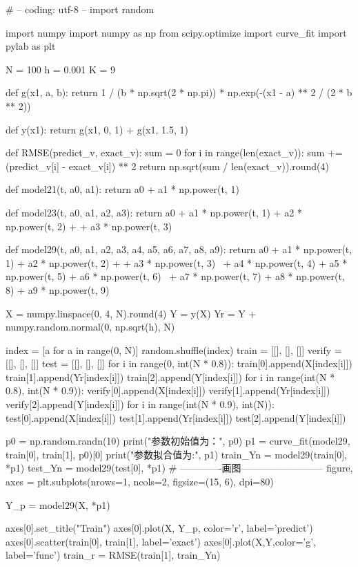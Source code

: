 \begin{python}
    # -- coding: utf-8 --
import random

import numpy
import numpy as np
from scipy.optimize import curve_fit
import pylab as plt

N = 100
h = 0.001
K = 9


def g(x1, a, b):
    return 1 / (b * np.sqrt(2 * np.pi)) * np.exp(-(x1 - a) ** 2 / (2 * b ** 2))


def y(x1):
    return g(x1, 0, 1) + g(x1, 1.5, 1)


def RMSE(predict_v, exact_v):
    sum = 0
    for i in range(len(exact_v)):
        sum += (predict_v[i] - exact_v[i]) ** 2
    return np.sqrt(sum / len(exact_v)).round(4)


def model21(t, a0, a1):
    return a0 + a1 * np.power(t, 1)

def model23(t, a0, a1, a2, a3):
    return a0 + a1 * np.power(t, 1) + a2 * np.power(t, 2) + + a3 * np.power(t, 3)

def model29(t, a0, a1, a2, a3, a4, a5, a6, a7, a8, a9):
    return a0 + a1 * np.power(t, 1) + a2 * np.power(t, 2) + + a3 * np.power(t, 3) \
           + a4 * np.power(t, 4) + a5 * np.power(t, 5) + a6 * np.power(t, 6) \
           + a7 * np.power(t, 7) + a8 * np.power(t, 8) + a9 * np.power(t, 9)


X = numpy.linspace(0, 4, N).round(4)
Y = y(X)
Yr = Y + numpy.random.normal(0, np.sqrt(h), N)

index = [a for a in range(0, N)]
random.shuffle(index)
train = [[], [], []]
verify = [[], [], []]
test = [[], [], []]
for i in range(0, int(N * 0.8)):
    train[0].append(X[index[i]])
    train[1].append(Yr[index[i]])
    train[2].append(Y[index[i]])
for i in range(int(N * 0.8), int(N * 0.9)):
    verify[0].append(X[index[i]])
    verify[1].append(Yr[index[i]])
    verify[2].append(Y[index[i]])
for i in range(int(N * 0.9), int(N)):
    test[0].append(X[index[i]])
    test[1].append(Yr[index[i]])
    test[2].append(Y[index[i]])

p0 = np.random.randn(10)
print("参数初始值为：", p0)
p1 = curve_fit(model29, train[0], train[1], p0)[0]
print("参数拟合值为:", p1)
train_Yn = model29(train[0], *p1)
test_Yn = model29(test[0], *p1)
# -------------画图--------------------------
figure, axes = plt.subplots(nrows=1, ncols=2, figsize=(15, 6), dpi=80)

Y_p = model29(X, *p1)

axes[0].set_title("Train")
axes[0].plot(X, Y_p, color='r', label='predict')
axes[0].scatter(train[0], train[1], label='exact')
axes[0].plot(X,Y,color='g', label='func')
train_r = RMSE(train[1], train_Yn)


\end{python}
